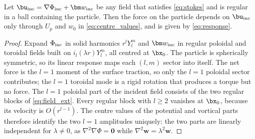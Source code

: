 \begin{lemma}\label{lem:faxen}
Let $\bu_{\rm inc}=\nabla\Phi_{\rm inc}+\bm w_{\rm inc}$ be any field that satisfies \cref{eq:stokes} and is regular in a
ball containing the particle. Then the force on the particle depends on $\bu_{\rm inc}$ only through $U_p$ and $w_0$ in
\cref{eq:centre_values}, and is given by \cref{eq:response}.
\end{lemma}
\begin{proof}
Expand $\Phi_{\rm inc}$ in solid harmonics $r^lY_l^m$ and $\bm w_{\rm inc}$ in regular poloidal and toroidal fields
built on $i_l(\lambda r)Y_l^m$, all centred at $\bx_0$. The particle is spherically symmetric, so its linear response
maps each $(l,m)$ sector into itself. The net force is the $l=1$ moment of the surface traction, so only the $l=1$
poloidal sector contributes; the $l=1$ toroidal mode is a rigid rotation that produces a torque but no force. The
$l=1$ poloidal part of the incident field consists of the two regular blocks of \cref{eq:field_ext}. Every regular
block with $l\ge2$ vanishes at $\bx_0$, because its velocity is $O(r^{l-1})$. The centre values of the potential and
vortical parts therefore identify the two $l=1$ amplitudes uniquely: the two parts are linearly independent for
$\lambda\neq0$, as $\nabla^2\nabla\Phi=\bm 0$ while $\nabla^2\bm w=\lambda^2\bm w$.
\end{proof}

